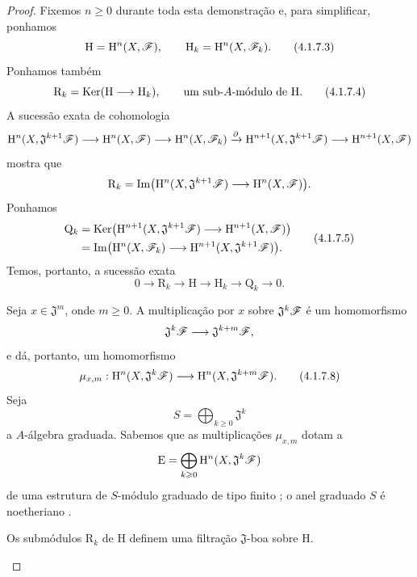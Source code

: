 \begin{proof}
Fixemos $n\geq0$ durante toda esta demonstração e, para simplificar,
ponhamos
\[
  \mathrm{H}=\HH^n(X,\sh{F}),
  \qquad
  \mathrm{H}_k=\HH^n(X,\sh{F}_k).
  \tag{4.1.7.3}
  \label{III.4.1.7.3}
\]
Ponhamos também
\[
  \mathrm{R}_k
  =
  \Ker(\mathrm{H}\longrightarrow\mathrm{H}_k),
  \qquad
  \text{um sub-$A$-módulo de $\mathrm{H}$.}
  \tag{4.1.7.4}
  \label{III.4.1.7.4}
\]
A sucessão exata de cohomologia
\[
  \mathrm{H}^n(X,\mathfrak{J}^{k+1}\mathscr{F})
  \longrightarrow
  \mathrm{H}^n(X,\mathscr{F})
  \longrightarrow
  \mathrm{H}^n(X,\mathscr{F}_k)
  \xrightarrow{\partial}
  \mathrm{H}^{n+1}(X,\mathfrak{J}^{k+1}\mathscr{F})
  \longrightarrow
  \mathrm{H}^{n+1}(X,\mathscr{F})
\]
mostra que
\[
  \mathrm{R}_k
  =
  \operatorname{Im}\bigl(
    \mathrm{H}^n(X,\mathfrak{J}^{k+1}\mathscr{F})
    \longrightarrow
    \mathrm{H}^n(X,\mathscr{F})
  \bigr).
\]
Ponhamos
\[
  \begin{split}
  \mathrm{Q}_k
  &=
  \Ker\bigl(
    \HH^{n+1}(X,\mathfrak{J}^{k+1}\sh{F})
    \longrightarrow
    \HH^{n+1}(X,\sh{F})
  \bigr)
  \\
  &=
  \Im\bigl(
    \HH^n(X,\sh{F}_k)
    \longrightarrow
    \HH^{n+1}(X,\mathfrak{J}^{k+1}\sh{F})
  \bigr).
  \end{split}
  \tag{4.1.7.5}
  \label{III.4.1.7.5}
\]
Temos, portanto, a sucessão exata
\[
  0\longrightarrow\mathrm{R}_k
  \longrightarrow\mathrm{H}
  \longrightarrow\mathrm{H}_k
  \longrightarrow\mathrm{Q}_k
  \longrightarrow0.
  \tag{4.1.7.6}
  \label{III.4.1.7.6}
\]

\begin{env}[4.1.7.7]
\label{III.4.1.7.7}
Seja $x\in\mathfrak{J}^m$, onde $m\geq0$.
A multiplicação por $x$ sobre $\mathfrak{J}^k\mathscr{F}$ é um
homomorfismo
\[
  \mathfrak{J}^k\mathscr{F}
  \longrightarrow
  \mathfrak{J}^{k+m}\mathscr{F},
\]
e dá, portanto, um homomorfismo
\[
  \mu_{x,m}:
  \HH^n(X,\mathfrak{J}^k\sh{F})
  \longrightarrow
  \HH^n(X,\mathfrak{J}^{k+m}\sh{F}).
  \tag{4.1.7.8}
  \label{III.4.1.7.8}
\]
Seja
\[
  S=\bigoplus_{k\geq0}\mathfrak{J}^k
\]
a $A$-álgebra graduada.
Sabemos que as multiplicações $\mu_{x,m}$ dotam a
\[
  \mathrm{E}
  =
  \bigoplus_{k\geqslant0}
  \mathrm{H}^n(X,\mathfrak{J}^k\mathscr{F})
\]
de uma estrutura de $S$-módulo graduado de tipo finito
; o anel graduado $S$ é noetheriano
.
\end{env}

\begin{lemma}[4.1.7.9]
\label{III.4.1.7.9}
Os submódulos $\mathrm{R}_k$ de $\mathrm{H}$ definem uma
filtração $\mathfrak{J}$-boa sobre $\mathrm{H}$.
\end{lemma}


\end{proof}
